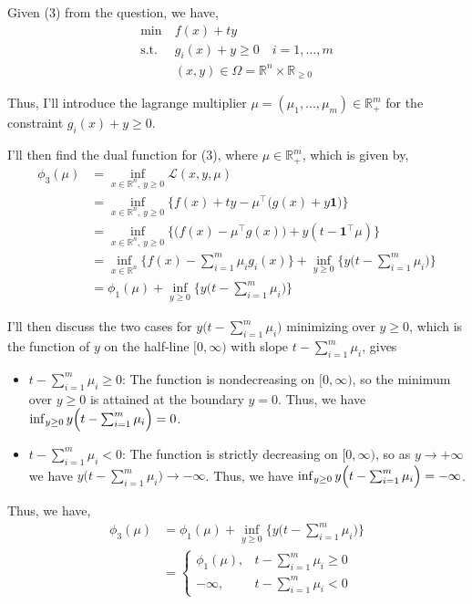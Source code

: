 \documentclass[12pt]{article}
\begin{document}
Given (3) from the question, we have, 
\begin{align*}
		\min\ &f(x)+ty \\
		\text{s.t.}\ &g_i(x) + y\geq 0 \quad i=1,\dots,m\\
		&(x,y)\in\Omega=\mathbb{R}^n\times\mathbb{R}_{\geq 0}
\end{align*}

Thus, I'll introduce the lagrange multiplier $\mu = (\mu_1, ..., \mu_m) \in \mathbb{R}_+^m$ for the constraint $g_i(x) + y\geq 0$.

I'll then find the dual function for (3), where $\mu\in\mathbb R_+^m$, which is given by, 
\begin{align*}
	\phi_3(\mu)&=\inf_{x\in\mathbb R^n,\ y\ge 0}\mathcal L(x,y,\mu) \\
	&= \inf_{x\in\mathbb R^n,\ y\ge 0} \bigl\{f(x)+t y-\mu^\top\!\bigl(g(x)+y\mathbf 1\bigr) \bigr\} \\
	&= \inf_{x\in\mathbb R^n,\ y\ge 0} \bigl\{\bigl(f(x)-\mu^\top g(x)\bigr)+y(t-\mathbf 1^\top\mu) \bigr\} \\
	&= \inf_{x\in\mathbb R^n}\bigl\{f(x)-\sum_{i=1}^m \mu_i g_i(x)\bigr\} + \inf_{y\ge 0}\bigl\{y\bigl(t-\sum_{i=1}^m \mu_i\bigr)\bigr\} \\
	&= \phi_1(\mu) + \inf_{y\ge 0}\bigl\{y\bigl(t-\sum_{i=1}^m \mu_i\bigr)\bigr\}
\end{align*}

I'll then discuss the two cases for $y\bigl(t-\sum_{i=1}^m \mu_i\bigr)$ minimizing over $y\ge 0$, which is the function of $y$ on the half-line $[0,\infty)$ with slope $t-\sum_{i=1}^m \mu_i$, gives
\begin{itemize}
	\item $t-\sum_{i=1}^m \mu_i \ge 0$: The function is nondecreasing on $[0,\infty)$, so the minimum over $y\ge 0$ is attained at the boundary $y=0$. Thus, we have $\inf_{y\ge 0} y\Bigl(t-\sum_{i=1}^m \mu_i\Bigr)=0$.
	\item $t-\sum_{i=1}^m \mu_i <0$: The function is strictly decreasing on $[0,\infty)$, so as $y\to+\infty$ we have $y\bigl(t-\sum_{i=1}^m \mu_i\bigr)\to -\infty$. Thus, we have $\inf_{y\ge 0} y\Bigl(t-\sum_{i=1}^m \mu_i\Bigr)=-\infty$.
\end{itemize}

Thus, we have, 
\begin{align*}
	\phi_3(\mu)&=\phi_1(\mu) + \inf_{y\ge 0}\bigl\{y\bigl(t-\sum_{i=1}^m \mu_i\bigr)\bigr\} \\
	&= \begin{cases}
			\phi_1(\mu), & t-\sum_{i=1}^m \mu_i \ge 0\\
			-\infty, & t-\sum_{i=1}^m \mu_i <0
		\end{cases} \\
\end{align*}
\end{document}
